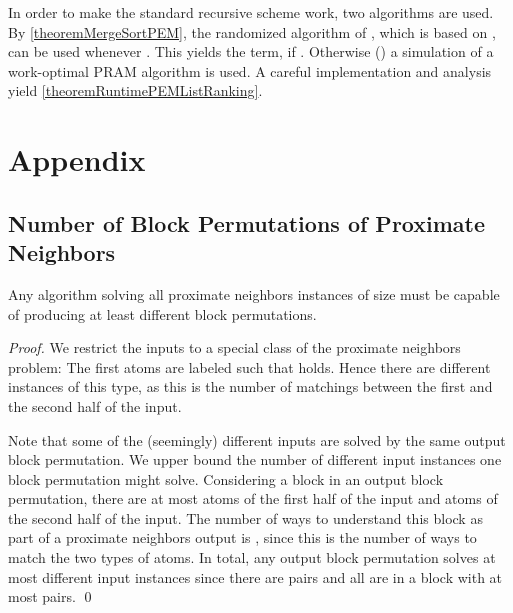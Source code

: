 \documentclass[envcountsame]{llncs}
\begin{document}
In order to make the standard recursive scheme work, two algorithms are used.
By \autoref{theoremMergeSortPEM}, the randomized algorithm of \cite{2010ArgeEtAlGraphAlgoPEM}, which is based on \cite{1984VishkinRandomizedLR}, can be used whenever .
This yields the  term, if .
Otherwise () a simulation of a work-optimal PRAM algorithm \cite{1988AndersonMillerDetLR} is used.
A careful implementation and analysis yield \autoref{theoremRuntimePEMListRanking}.
























\newpage
\appendix

\section{Appendix}

\subsection{Number of Block Permutations of Proximate Neighbors}
\label{appendixProximateNeighbors}

\begin{lemma}
Any algorithm solving all proximate neighbors instances of size  must be capable of producing at least  different block permutations.
\end{lemma}

\begin{proof}


We restrict the inputs to a special class of the proximate neighbors problem:
The first  atoms are labeled such that  holds.
Hence there are  different instances of this type, as this is the number of matchings between the first and the second half of the input.

Note that some of the (seemingly) different inputs are solved by the same output block permutation.
We upper bound the number of different input instances one block permutation might solve.
Considering a block in an output block permutation, there are at most  atoms of the first half of the input and  atoms of the second half of the input.
The number of ways to understand this block as part of a proximate neighbors output is , since this is the number of ways to match the two types of atoms. In total, any output block permutation solves at most  different input instances since there are  pairs and all are in a block with at most  pairs.
\qed
\end{proof}
\end{document}
